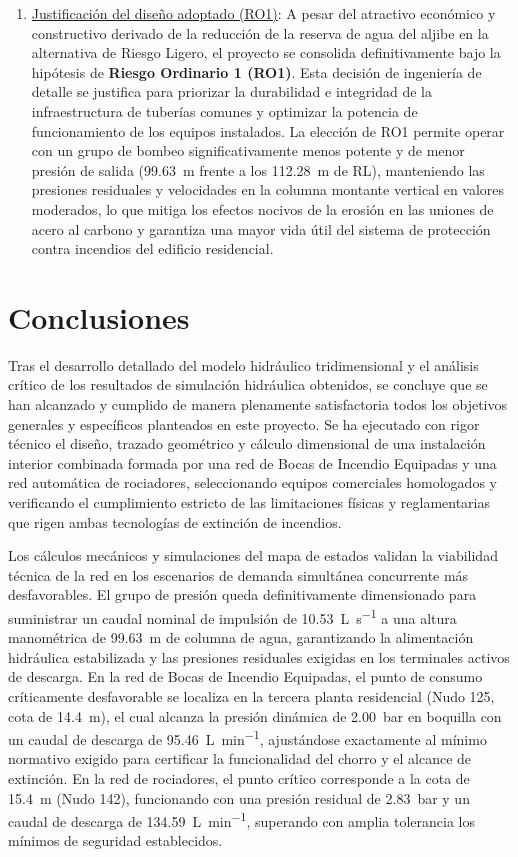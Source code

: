\documentclass[12pt,a4paper]{article}
\begin{document}
\begin{enumerate}
	\item \underline{Justificación del diseño adoptado (RO1)}: A pesar del atractivo económico y constructivo derivado de la reducción de la reserva de agua del aljibe en la alternativa de Riesgo Ligero, el proyecto se consolida definitivamente bajo la hipótesis de \textbf{Riesgo Ordinario 1 (RO1)}. Esta decisión de ingeniería de detalle se justifica para priorizar la durabilidad e integridad de la infraestructura de tuberías comunes y optimizar la potencia de funcionamiento de los equipos instalados. La elección de RO1 permite operar con un grupo de bombeo significativamente menos potente y de menor presión de salida (\SI{99.63}{\meter} frente a los \SI{112.28}{\meter} de RL), manteniendo las presiones residuales y velocidades en la columna montante vertical en valores moderados, lo que mitiga los efectos nocivos de la erosión en las uniones de acero al carbono y garantiza una mayor vida útil del sistema de protección contra incendios del edificio residencial.
\end{enumerate}

\section{Conclusiones}

Tras el desarrollo detallado del modelo hidráulico tridimensional y el análisis crítico de los resultados de simulación hidráulica obtenidos, se concluye que se han alcanzado y cumplido de manera plenamente satisfactoria todos los objetivos generales y específicos planteados en este proyecto. Se ha ejecutado con rigor técnico el diseño, trazado geométrico y cálculo dimensional de una instalación interior combinada formada por una red de Bocas de Incendio Equipadas y una red automática de rociadores, seleccionando equipos comerciales homologados y verificando el cumplimiento estricto de las limitaciones físicas y reglamentarias que rigen ambas tecnologías de extinción de incendios.

Los cálculos mecánicos y simulaciones del mapa de estados validan la viabilidad técnica de la red en los escenarios de demanda simultánea concurrente más desfavorables. El grupo de presión queda definitivamente dimensionado para suministrar un caudal nominal de impulsión de \SI{10.53}{\liter\per\second} a una altura manométrica de \SI{99.63}{\meter} de columna de agua, garantizando la alimentación hidráulica estabilizada y las presiones residuales exigidas en los terminales activos de descarga. En la red de Bocas de Incendio Equipadas, el punto de consumo críticamente desfavorable se localiza en la tercera planta residencial (Nudo 125, cota de \SI{14.4}{\meter}), el cual alcanza la presión dinámica de \SI{2.00}{\bar} en boquilla con un caudal de descarga de \SI{95.46}{\liter\per\minute}, ajustándose exactamente al mínimo normativo exigido para certificar la funcionalidad del chorro y el alcance de extinción. En la red de rociadores, el punto crítico corresponde a la cota de \SI{15.4}{\meter} (Nudo 142), funcionando con una presión residual de \SI{2.83}{\bar} y un caudal de descarga de \SI{134.59}{\liter\per\minute}, superando con amplia tolerancia los mínimos de seguridad establecidos.
\end{document}
